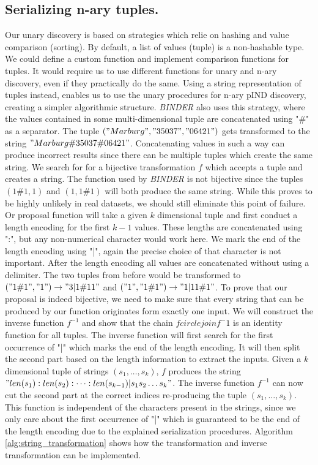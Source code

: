 \subsection{Serializing n-ary tuples.}
Our unary discovery is based on strategies which relie on hashing and value comparison (sorting). By default, a list of values (tuple) is a non-hashable type. We could define a custom function and implement comparison functions for tuples. It would require us to use different functions for unary and n-ary discovery, even if they practically do the same. Using a string representation of tuples instead, enables us to use the unary procedures for n-ary pIND discovery, creating a simpler algorithmic structure. \textit{BINDER} also uses this strategy, where the values contained in some multi-dimensional tuple are concatenated using "\#" as a separator. The tuple $("Marburg", "35037", "06421")$ gets transformed to the string $"Marburg\#35037\#06421"$. Concatenating values in such a way can produce incorrect results since there can be multiple tuples which create the same string. We search for for a bijective transformation $f$ which accepts a tuple and creates a string. The function used by \textit{BINDER} is not bijective since the tuples $(1\#1, 1)$ and $(1, 1\#1)$ will both produce the same string. While this proves to be highly unlikely in real datasets, we should still eliminate this point of failure.
Or proposal function will take a given $k$ dimensional tuple and first conduct a length encoding for the first $k-1$ values. These lengths are concatenated using ":", but any non-numerical character would work here. We mark the end of the length encoding using "|", again the precise choice of that character is not important. After the length encoding all values are concatenated without using a delimiter. The two tuples from before would be transformed to$("1\#1", "1") \rightarrow "3|1\#11"$ and $("1", "1\#1") \rightarrow "1|11\#1"$.
To prove that our proposal is indeed bijective, we need to make sure that every string that can be produced by our function originates form exactly one input. We will construct the inverse function $f^{-1}$ and show that the chain $f circlejoin {f^-1}$ is an identity function for all tuples. The inverse function will first search for the first occurrence of "|" which marks the end of the length encoding. It will then split the second part based on the length information to extract the inputs.
Given a $k$ dimensional tuple of strings $(s_1, \dots, s_k)$, $f$ produces the string $"len(s_1):len(s_2):\dots:len(s_{k-1})|s_1 s_2 \dots s_k"$. The inverse function $f^{-1}$ can now cut the second part at the correct indices re-producing the tuple $(s_1, \dots, s_k)$. This function is independent of the characters present in the strings, since we only care about the first occurrence of "|" which is guaranteed to be the end of the length encoding due to the explained serialization procedures. Algorithm \ref{alg:string_transformation} shows how the transformation and inverse transformation can be implemented.

